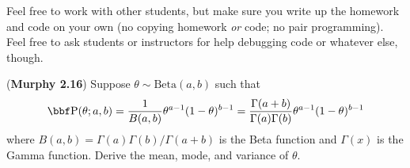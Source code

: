 \documentclass[12pt,letterpaper,fleqn]{hmcpset}
\begin{document}
\newcommand{\sumk}{\sum_{i=1}^K}
\newcommand{\sumkL}{\sum_{i=1}^{K-1}}
\newcommand{\eeta}{\boldsymbol{\eta}}
\newcommand{\pro}{\PP(\theta;a,b)}
Feel free to work with other students, but make sure you write up the homework
and code on your own (no copying homework \textit{or} code; no pair programming).
Feel free to ask students or instructors for help debugging code or whatever else,
though.

\begin{problem}[1]
(\textbf{Murphy 2.16}) Suppose $\theta \sim \text{Beta}(a,b)$ such
        that
        \[
            \PP(\theta; a,b) = \frac{1}{B(a,b)} \theta^{a-1}(1-\theta)^{b-1} = \frac{\Gamma(a+b)}{\Gamma(a)\Gamma(b)} \theta^{a-1}(1-\theta)^{b-1}
        \]
        where $B(a,b) = \Gamma(a)\Gamma(b)/\Gamma(a+b)$ is the Beta function
        and $\Gamma(x)$ is the Gamma function.
        Derive the mean, mode, and variance of $\theta$.
\end{problem}
\end{document}
